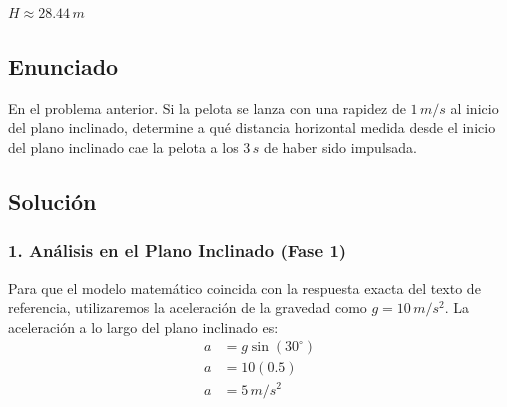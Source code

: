 \documentclass[12pt, a4paper]{article}
\begin{document}
\begin{tcolorbox}[colback=green!5!white, colframe=green!50!black, title=Respuesta Final]
\centering \Large $H \approx 28.44 \, \si{m}$
\end{tcolorbox}

\newpage

\subsection*{Enunciado}
En el problema anterior. Si la pelota se lanza con una rapidez de $1 \, \si{m/s}$ al inicio del plano inclinado, determine a qué distancia horizontal medida desde el inicio del plano inclinado cae la pelota a los $3 \, \si{s}$ de haber sido impulsada.

\begin{center}
\end{center}

\subsection*{Solución}

\subsubsection*{1. Análisis en el Plano Inclinado (Fase 1)}
Para que el modelo matemático coincida con la respuesta exacta del texto de referencia, utilizaremos la aceleración de la gravedad como $g = 10 \, \si{m/s^2}$.
La aceleración a lo largo del plano inclinado es:
\begin{align*}
a &= g \sin(30^\circ) \\
a &= 10 (0.5) \\
a &= 5 \, \si{m/s^2}
\end{align*}
\end{document}
